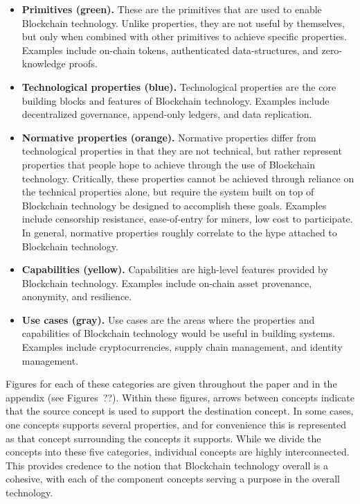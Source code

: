  \renewcommand{\labelitemi}{$\blacksquare$}
\begin{itemize}
	\item \textbf{Primitives (green).} These are the primitives that are used to enable Blockchain technology. Unlike properties, they are not useful by themselves, but only when combined with other primitives to achieve specific properties. Examples include on-chain tokens, authenticated data-structures, and zero-knowledge proofs.
	
	\item \textbf{Technological properties (blue).} Technological properties are the core building blocks and features of Blockchain technology. Examples include decentralized governance, append-only ledgers, and data replication.
	
	\item \textbf{Normative properties (orange).} Normative properties differ from technological properties in that they are not technical, but rather represent properties that people hope to achieve through the use of Blockchain technology. Critically, these properties cannot be achieved through reliance on the technical properties alone, but require the system built on top of Blockchain technology be designed to accomplish these goals. Examples include censorship resistance, ease-of-entry for miners, low cost to participate.
	In general, normative properties roughly correlate to the hype attached to Blockchain technology.

	\item \textbf{Capabilities (yellow).} Capabilities are high-level features provided by Blockchain technology. Examples include on-chain asset provenance, anonymity, and resilience.
	
	\item \textbf{Use cases (gray).} Use cases are the areas where the properties and capabilities of Blockchain technology would be useful in building systems. Examples include cryptocurrencies, supply chain management, and identity management.
\end{itemize}
 \renewcommand{\labelitemi}{\textbullet}

Figures for each of these categories are given throughout the paper and in the appendix (see Figures~??).
Within these figures, arrows between concepts indicate that the source concept is used to support the destination concept.
In some cases, one concepts supports several properties, and for convenience this is represented as that concept surrounding the concepts it supports.
While we divide the concepts into these five categories, individual concepts are highly interconnected. This provides credence to the notion that Blockchain technology overall is a cohesive, with each of the component concepts serving a purpose in the overall technology.

